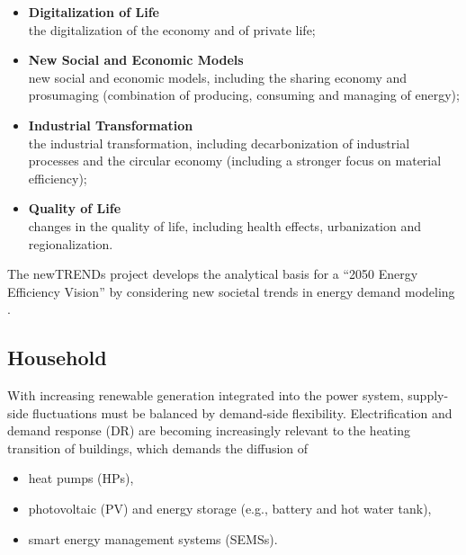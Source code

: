 \begin{itemize}
  \item \textbf{Digitalization of Life} \\ the digitalization of the economy and of private life;
  \item \textbf{New Social and Economic Models} \\ new social and economic models, including the sharing economy and prosumaging (combination of producing, consuming and managing of energy);
  \item \textbf{Industrial Transformation} \\ the industrial transformation, including decarbonization of industrial processes and the circular economy (including a stronger focus on material efficiency);
  \item \textbf{Quality of Life} \\ changes in the quality of life, including health effects, urbanization and regionalization. 
\end{itemize}

The newTRENDs project develops the analytical basis for a “2050 Energy Efficiency Vision” by considering new societal trends in energy demand modeling \cite{newtrends}. 

\subsection{Household}

With increasing renewable generation integrated into the power system, supply-side fluctuations must be balanced by demand-side flexibility. 
Electrification and demand response (DR) are becoming increasingly relevant to the heating transition of buildings, which demands the diffusion of

\begin{itemize}
  \item heat pumps (HPs),
  \item photovoltaic (PV) and energy storage (e.g., battery and hot water tank),
  \item smart energy management systems (SEMSs).
\end{itemize}


